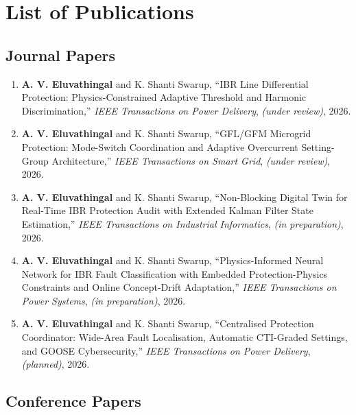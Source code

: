 \chapter*{List of Publications}

\section*{Journal Papers}

\begin{enumerate}

\item \textbf{A. V. Eluvathingal} and K. Shanti Swarup,
  ``IBR Line Differential Protection: Physics-Constrained Adaptive Threshold
  and Harmonic Discrimination,''
  \textit{IEEE Transactions on Power Delivery},
  \textit{(under review)}, 2026.

\item \textbf{A. V. Eluvathingal} and K. Shanti Swarup,
  ``GFL/GFM Microgrid Protection: Mode-Switch Coordination and Adaptive
  Overcurrent Setting-Group Architecture,''
  \textit{IEEE Transactions on Smart Grid},
  \textit{(under review)}, 2026.

\item \textbf{A. V. Eluvathingal} and K. Shanti Swarup,
  ``Non-Blocking Digital Twin for Real-Time IBR Protection Audit with
  Extended Kalman Filter State Estimation,''
  \textit{IEEE Transactions on Industrial Informatics},
  \textit{(in preparation)}, 2026.

\item \textbf{A. V. Eluvathingal} and K. Shanti Swarup,
  ``Physics-Informed Neural Network for IBR Fault Classification with
  Embedded Protection-Physics Constraints and Online Concept-Drift Adaptation,''
  \textit{IEEE Transactions on Power Systems},
  \textit{(in preparation)}, 2026.

\item \textbf{A. V. Eluvathingal} and K. Shanti Swarup,
  ``Centralised Protection Coordinator: Wide-Area Fault Localisation,
  Automatic CTI-Graded Settings, and GOOSE Cybersecurity,''
  \textit{IEEE Transactions on Power Delivery},
  \textit{(planned)}, 2026.

\end{enumerate}

\section*{Conference Papers}

